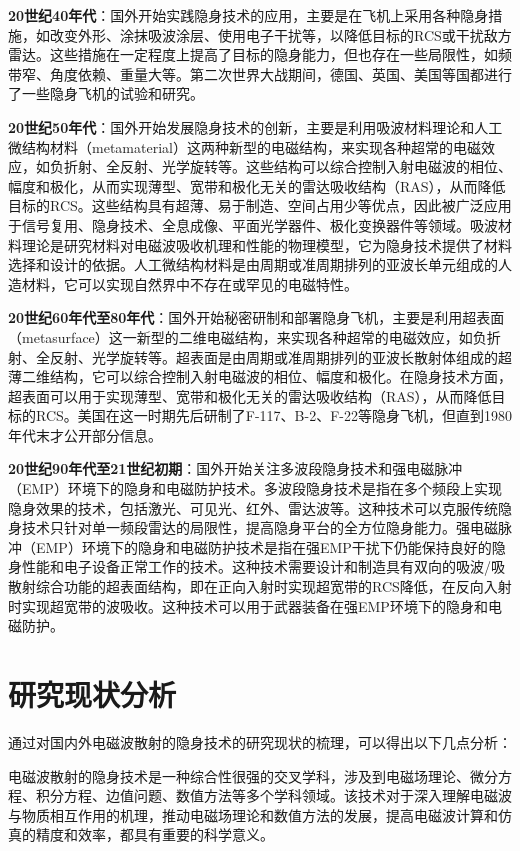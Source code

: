 \documentclass{article}
\begin{document}
\textbf{20世纪40年代}：国外开始实践隐身技术的应用，主要是在飞机上采用各种隐身措施，如改变外形、涂抹吸波涂层、使用电子干扰等，以降低目标的RCS或干扰敌方雷达。这些措施在一定程度上提高了目标的隐身能力，但也存在一些局限性，如频带窄、角度依赖、重量大等。第二次世界大战期间，德国、英国、美国等国都进行了一些隐身飞机的试验和研究。

\textbf{20世纪50年代}：国外开始发展隐身技术的创新，主要是利用吸波材料理论和人工微结构材料（metamaterial）这两种新型的电磁结构，来实现各种超常的电磁效应，如负折射、全反射、光学旋转等。这些结构可以综合控制入射电磁波的相位、幅度和极化，从而实现薄型、宽带和极化无关的雷达吸收结构（RAS），从而降低目标的RCS。这些结构具有超薄、易于制造、空间占用少等优点，因此被广泛应用于信号复用、隐身技术、全息成像、平面光学器件、极化变换器件等领域。吸波材料理论是研究材料对电磁波吸收机理和性能的物理模型，它为隐身技术提供了材料选择和设计的依据。人工微结构材料是由周期或准周期排列的亚波长单元组成的人造材料，它可以实现自然界中不存在或罕见的电磁特性。

\textbf{20世纪60年代至80年代}：国外开始秘密研制和部署隐身飞机，主要是利用超表面（metasurface）这一新型的二维电磁结构，来实现各种超常的电磁效应，如负折射、全反射、光学旋转等。超表面是由周期或准周期排列的亚波长散射体组成的超薄二维结构，它可以综合控制入射电磁波的相位、幅度和极化。在隐身技术方面，超表面可以用于实现薄型、宽带和极化无关的雷达吸收结构（RAS），从而降低目标的RCS。美国在这一时期先后研制了F-117、B-2、F-22等隐身飞机，但直到1980年代末才公开部分信息。

\textbf{20世纪90年代至21世纪初期}：国外开始关注多波段隐身技术和强电磁脉冲（EMP）环境下的隐身和电磁防护技术。多波段隐身技术是指在多个频段上实现隐身效果的技术，包括激光、可见光、红外、雷达波等。这种技术可以克服传统隐身技术只针对单一频段雷达的局限性，提高隐身平台的全方位隐身能力。强电磁脉冲（EMP）环境下的隐身和电磁防护技术是指在强EMP干扰下仍能保持良好的隐身性能和电子设备正常工作的技术。这种技术需要设计和制造具有双向的吸波/吸散射综合功能的超表面结构，即在正向入射时实现超宽带的RCS降低，在反向入射时实现超宽带的波吸收。这种技术可以用于武器装备在强EMP环境下的隐身和电磁防护。
\section{研究现状分析}
通过对国内外电磁波散射的隐身技术的研究现状的梳理，可以得出以下几点分析：

电磁波散射的隐身技术是一种综合性很强的交叉学科，涉及到电磁场理论、微分方程、积分方程、边值问题、数值方法等多个学科领域。该技术对于深入理解电磁波与物质相互作用的机理，推动电磁场理论和数值方法的发展，提高电磁波计算和仿真的精度和效率，都具有重要的科学意义。
\end{document}
